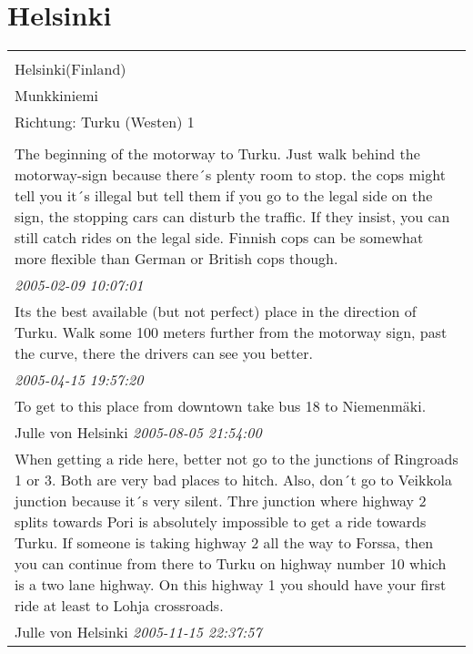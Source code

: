 \documentclass[a4paper,12pt]{article}
\begin{document}
\section{Helsinki}
\begin{tabular}{|p{13cm}|}
\hline\\
Helsinki(Finland)\\
Munkkiniemi\\
Richtung: Turku (Westen) 1 \\
\hline\\
The beginning of the motorway to Turku. Just walk behind the motorway-sign because there´s plenty room to stop. the cops might tell you it´s illegal but tell them if you go to the legal side on the sign, the stopping cars can disturb the traffic. If they insist, you can still catch rides on the legal side. Finnish cops can be somewhat more flexible than German or British cops though. \\
\textit{ 2005-02-09 10:07:01 }\\\hline Its the best available (but not perfect) place in the direction of Turku. Walk some 100 meters further from the motorway sign, past the curve, there the drivers can see you better. \\
\textit{ 2005-04-15 19:57:20 }\\\hline To get to this place from downtown take bus 18 to Niemenmäki. \\
Julle von Helsinki \textit{ 2005-08-05 21:54:00 }\\\hline When getting a ride here, better not go to the junctions of Ringroads 1 or 3. Both are very bad places to hitch. Also, don´t go to Veikkola junction because it´s very silent. Thre junction where highway 2 splits towards Pori is absolutely impossible to get a ride towards Turku. If someone is taking highway 2 all the way to Forssa, then you can continue from there to Turku on highway number 10 which is a two lane highway. On this highway 1 you should have your first ride at least to Lohja crossroads. \\
Julle von Helsinki \textit{ 2005-11-15 22:37:57 }\\\hline
\end{tabular}
\end{document}
